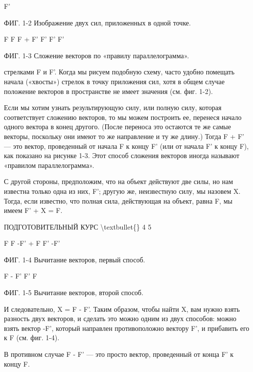 \documentclass[10pt,oneside]{article}
\begin{document}
F'\par

ФИГ. 1-2 Изображение двух сил, приложенных в одной точке.\par

F F F + F' F' F' F'\par

ФИГ. 1-3 Сложение векторов по «правилу параллелограмма».\par

стрелками F и F'. Когда мы рисуем подобную схему, часто удобно помещать начала («хвосты») стрелок в точку приложения сил, хотя в общем случае положение векторов в пространстве не имеет значения (см. фиг. 1-2).\par

Если мы хотим узнать результирующую силу, или полную силу, которая соответствует сложению векторов, то мы можем построить ее, перенеся начало одного вектора в конец другого. (После переноса это остаются те же самые векторы, поскольку они имеют то же направление и ту же длину.) Тогда F + F' --- это вектор, проведенный от начала F к концу F' (или от начала F' к концу F), как показано на рисунке 1-3. Этот способ сложения векторов иногда называют «правилом параллелограмма».\par

С другой стороны, предположим, что на объект действуют две силы, но нам известна только одна из них, F'; другую же, неизвестную силу, мы назовем X. Тогда, если известно, что полная сила, действующая на объект, равна F, мы имеем F' + X = F.\par

ПОДГОТОВИТЕЛЬНЫЙ КУРС \textbackslash{}textbullet\{\} 4 5\par

F F -F' + F F' -F'\par

ФИГ. 1-4 Вычитание векторов, первый способ.\par

F - F' F' F\par

ФИГ. 1-5 Вычитание векторов, второй способ.\par

И следовательно, X = F - F'. Таким образом, чтобы найти X, вам нужно взять разность двух векторов, и сделать это можно одним из двух способов: можно взять вектор -F', который направлен противоположно вектору F', и прибавить его к F (см. фиг. 1-4).\par

В противном случае F - F' --- это просто вектор, проведенный от конца F' к концу F.\par
\end{document}
